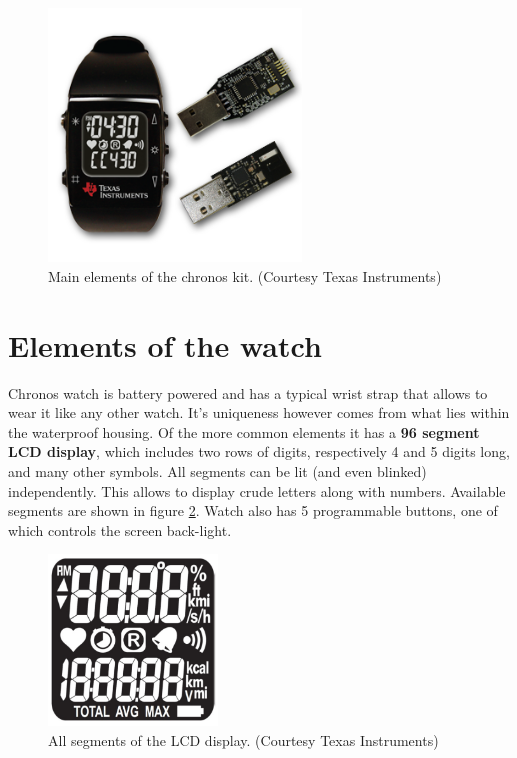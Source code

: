 \begin{figure}[h]
  \centering
  \includegraphics[width=0.6\textwidth]{img/chronos_watch.png}
  \caption{Main elements of the chronos kit. (Courtesy Texas
  Instruments)}
  \label{fig:chronos_watch}
\end{figure}

\section{Elements of the watch}
Chronos watch is battery powered and has a typical wrist strap that
allows to wear it like any other watch. It's uniqueness however comes
from what lies within the waterproof housing. Of the more common
elements it has a {\bf 96 segment LCD display}, which includes two
rows of digits, respectively 4 and 5 digits long, and many other
symbols. All segments can be lit (and even blinked) independently.
This allows to display crude letters along with numbers. Available
segments are shown in figure \ref{fig:chronos_segs}.  Watch also has 5
programmable buttons, one of which controls the screen back-light.

\begin{figure}[h]
  \centering
  \includegraphics[width=0.4\textwidth]{img/chronos_segs.png}
  \caption{All segments of the LCD display. (Courtesy Texas
  Instruments)}
  \label{fig:chronos_segs}
\end{figure}

